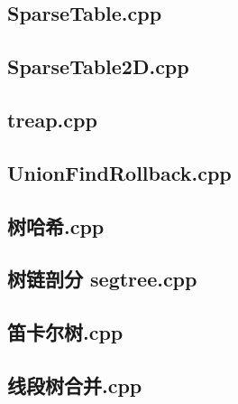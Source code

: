 \subsection{SparseTable.cpp}


\subsection{SparseTable2D.cpp}


\subsection{treap.cpp}


\subsection{UnionFindRollback.cpp}


\subsection{树哈希.cpp}


\subsection{树链剖分 segtree.cpp}


\subsection{笛卡尔树.cpp}


\subsection{线段树合并.cpp}


